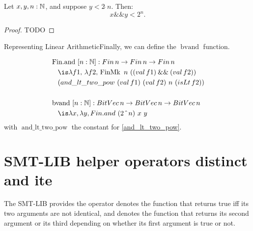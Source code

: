 \begin{lemma}
Let \( x, y, n : \mathbb{N} \), and suppose \( y < 2 \,\hat{}\, n \). Then:
\[
x \mathbin{\&\&} y < 2^n.
\]
\label{and_lt_two_pow}
\begin{proof} TODO \end{proof}
\end{lemma}

Representing Linear ArithmeticFinally, we can define the $\mathop{bvand}$ function.

\begin{definition}
\begin{align*}
&\mathop{\mathrm{Fin.and}}~[n: \N]: \mathop{Fin} n \ra \mathop{Fin} n \ra \mathop{Fin} n\\
&\quad\is \lambda f1,\, \lambda f2,\, \mathop{\mathrm{FinMk}}~n~((\mathop{val} f1) \mathbin{\&\&} (\mathop{val} f2)) \\
&\quad (\mathop{and\_lt\_two\_pow}~(\mathop{val} f1)~(\mathop{val} f2)~n~(\mathop{isLt} f2)) \\
&\\
&\mathop{\mathrm{bvand}}~[n: \N]: \mathop{BitVec} n \ra \mathop{BitVec} n \ra \mathop{BitVec} n\\
&\quad\is \lambda x, \lambda y, \mathop{Fin.and}~(2~\hat{}~n)~x~y
\end{align*}
with $\mathop{and\_lt\_two\_pow}$ the constant for \cref{and_lt_two_pow}.
\end{definition}

\section{SMT-LIB helper operators distinct and ite}
\label{ssec:encoding-distinct-let-enc}

The SMT-LIB provides the operator   denotes the function that
returns true iff its two arguments are not identical, and  denotes the function that
returns its second argument or its third depending on whether its first argument is true or not.


